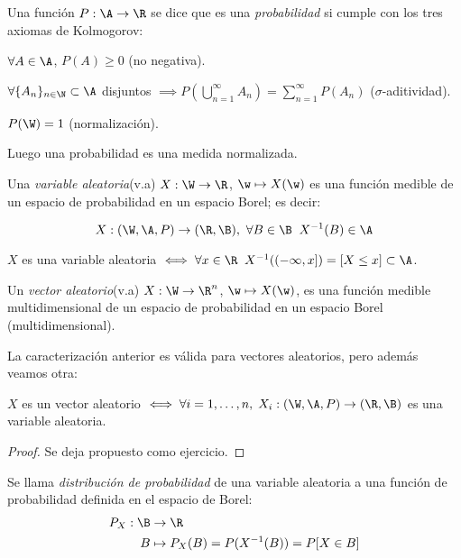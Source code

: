 \begin{ndef}[Probabilidad]
  Una función $P: \A \to \R$ se dice que es una \emph{probabilidad} si cumple con los tres axiomas de Kolmogorov:
  \begin{nlist}
    \item $\forall A \in \A$, $P(A) \geq 0$ (no negativa).
    \item $\forall \{A_n\}_{n \in \N} \subset \A$ disjuntos $\implies P(\bigcup \limits^\infty_{n = 1} A_n) = \sum \limits^\infty_{n = 1} P(A_n)$ ($\sigma$-aditividad).
    \item $P(\W) = 1$ (normalización).
  \end{nlist}
  Luego una probabilidad es una medida normalizada.
\end{ndef}

\begin{ndef}
  Una \emph{variable aleatoria}(v.a) $X : \W \to \R$, $\w \mapsto X(\w)$ es una función medible de un espacio de probabilidad en un espacio Borel; es decir:

  $$X : (\W, \A, P) \to (\R, \B), \, \, \forall B \in \B \; \; X^{-1}(B) \in \A$$
\end{ndef}

\begin{nprop}
  $X$ es una variable aleatoria $\iff \forall x \in \R \; \; X^{-1}((-\infty, x]) = [X \leq x] \subset \A$.
\end{nprop}

\begin{ndef}
  Un \emph{vector aleatorio}(v.a) $X : \W \to \R^n$, $\w \mapsto X(\w)$, es una función medible multidimensional de un espacio de probabilidad en un espacio Borel (multidimensional).
\end{ndef}

La caracterización anterior es válida para vectores aleatorios, pero además veamos otra:

\begin{ndef}
  $X$ es un vector aleatorio $\iff \forall i = 1, \ldots, n, \; X_i : (\W, \A, P) \to (\R, \B)$ es una variable aleatoria.
\end{ndef}

\begin{proof}
  Se deja propuesto como ejercicio.
\end{proof}


\begin{ndef}
  Se llama \emph{distribución de probabilidad} de una variable aleatoria a una función de probabilidad definida en el espacio de Borel:
  \begin{align*}
    P_X : \B & \to \R \\
    B & \mapsto P_X(B) = P(X^{-1}(B)) = P[X \in B]
  \end{align*}
\end{ndef}

